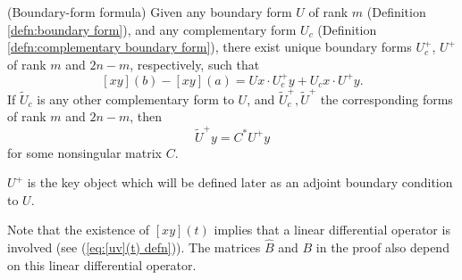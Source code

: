 \documentclass[11pt, oneside, a4paper]{article}
\begin{document}
\begin{thm}{(Boundary-form formula)}\label{thm:boundary form formula}
    Given any boundary form $U$ of rank $m$ (Definition \ref{defn:boundary form}), and any complementary form $U_c$ (Definition \ref{defn:complementary boundary form}), there exist unique boundary forms $U_c^+$, $U^+$ of rank $m$ and $2n-m$, respectively, such that
    \begin{equation}\label{eq:boundary form formula}
        [xy](b)-[xy](a) = Ux\cdot U_c^+y + U_{c}x\cdot U^+y.
    \end{equation}
    If $\tilde{U}_c$ is any other complementary form to $U$, and $\tilde{U}^+_c, \tilde{U}^+$ the corresponding forms of rank $m$ and $2n-m$, then
    \begin{equation}\label{eq:adjoint boundary forms unique up to linear transformation}
        \tilde{U}^+ y = C^*U^+y
    \end{equation}
    for some nonsingular matrix $C$.
\end{thm}
\begin{rmk}
    $U^+$ is the key object which will be defined later as an adjoint boundary condition to $U$.

    Note that the existence of $[xy](t)$ implies that a linear differential operator is involved (see (\ref{eq:[uv](t) defn})). The matrices $\hat{B}$ and $B$ in the proof also depend on this linear differential operator.
\end{rmk}
\end{document}
